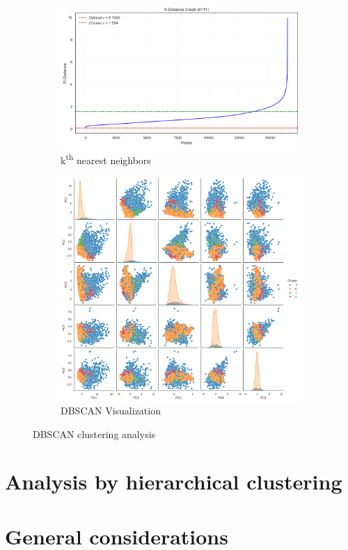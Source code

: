 \begin{figure}[h]
    \centering
    \begin{subfigure}[b]{0.49\textwidth}
        \centering
        \includegraphics[width=\textwidth]{plots/DBSCAN_kth_graph.png}
        \caption{k\textsuperscript{th} nearest neighbors}
        \label{fig:DBSCAN_kth_graph}
    \end{subfigure}
    \begin{subfigure}[b]{0.49\textwidth}
        \centering
        \includegraphics[width=\textwidth]{plots/DBSCAN_provvisoria.png}
        \caption{DBSCAN Visualization}
        \label{fig:DBSCAN_provvisoria}
    \end{subfigure}
    \caption{DBSCAN clustering analysis}
    \label{fig:three_subplots}
\end{figure}




\section{Analysis by hierarchical clustering}\label{sec:hierarchical}


\section{General considerations}\label{sec:considerations}